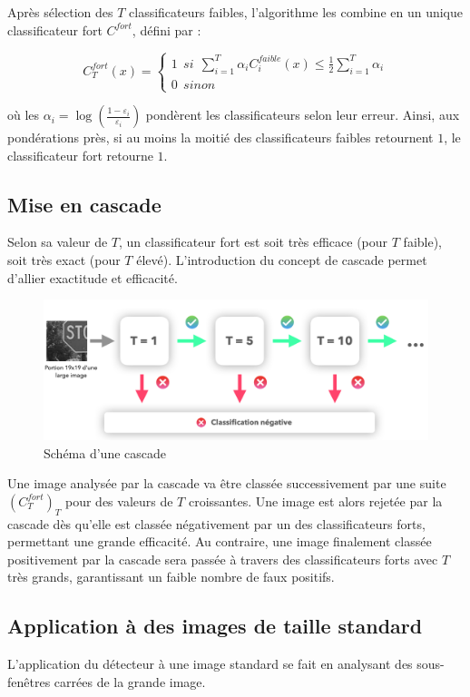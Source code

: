 \documentclass[12pt,a4paper]{article}
\begin{document}
Après sélection des $T$ classificateurs faibles, l'algorithme les combine en un unique classificateur fort $C^{fort}$, défini par :

\begin{equation}
    C_T^{fort}(x) = 
    \begin{cases}
    1 \:\: si \:\: \sum_{i=1}^T \alpha_i C_i^{faible}(x) \leq \frac{1}{2} \sum_{i=1}^T \alpha_i \\
    0 \:\: sinon
    \end{cases}
\end{equation}

où les $\alpha_i = \log(\frac{1 - \varepsilon_i}{\varepsilon_i})$ pondèrent les classificateurs selon leur erreur. Ainsi, aux pondérations près, si au moins la moitié des classificateurs faibles retournent $1$, le classificateur fort retourne $1$.


\subsection{Mise en cascade}
Selon sa valeur de $T$, un classificateur fort est soit très efficace (pour $T$ faible), soit très exact (pour $T$ élevé). L'introduction du concept de cascade permet d'allier exactitude et efficacité. 

\begin{figure}[h]
    \includegraphics[scale = 0.4]{cascade}
    \centering
    \caption{Schéma d'une cascade}
\end{figure}

Une image analysée par la cascade va être classée successivement par une suite $(C_T^{fort})_T$ pour des valeurs de $T$ croissantes. Une image est alors rejetée par la cascade dès qu'elle est classée négativement par un des classificateurs forts, permettant une grande efficacité. Au contraire, une image finalement classée positivement par la cascade sera passée à travers des classificateurs forts avec $T$ très grands, garantissant un faible nombre de faux positifs.

\subsection{Application à des images de taille standard}
\label{sec:taille_standard}
L'application du détecteur à une image standard se fait en analysant des sous-fenêtres carrées de la grande image. 
\end{document}
